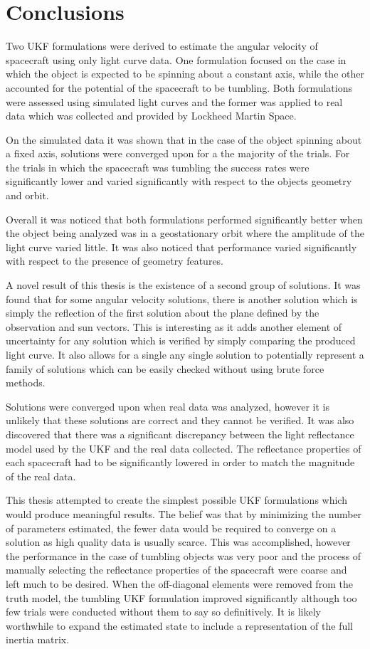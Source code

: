 \chapter{Conclusions}

Two UKF formulations were derived to estimate the angular velocity of spacecraft using only light curve data. One formulation focused on the case in which the object is expected to be spinning about a constant axis, while the other accounted for the potential of the spacecraft to be tumbling. Both formulations were assessed using simulated light curves and the former was applied to real data which was collected and provided by Lockheed Martin Space. 

On the simulated data it was shown that in the case of the object spinning about a fixed axis, solutions were converged upon for a the majority of the trials. For the trials in which the spacecraft was tumbling the success rates were significantly lower and varied significantly with respect to the objects geometry and orbit. 

Overall it was noticed that both formulations performed significantly better when the object being analyzed was in a geostationary orbit where the amplitude of the light curve varied little. It was also noticed that performance varied significantly with respect to the presence of geometry features. 

A novel result of this thesis is the existence of a second group of solutions. It was found that for some angular velocity solutions, there is another solution which is simply the reflection of the first solution about the plane defined by the observation and sun vectors. This is interesting as it adds another element of uncertainty for any solution which is verified by simply comparing the produced light curve. It also allows for a single any single solution to potentially represent a family of solutions which can be easily checked without using brute force methods.

Solutions were converged upon when real data was analyzed, however it is unlikely that these solutions are correct and they cannot be verified. It was also discovered that there was a significant discrepancy between the light reflectance model used by the UKF and the real data collected. The reflectance properties of each spacecraft had to be significantly lowered in order to match the magnitude of the real data.

This thesis attempted to create the simplest possible UKF formulations which would produce meaningful results. The belief was that by minimizing the number of parameters estimated, the fewer data would be required to converge on a solution as high quality data is usually scarce. This was accomplished, however the performance in the case of tumbling objects was very poor and the process of manually selecting the reflectance properties of the spacecraft were coarse and left much to be desired. When the off-diagonal elements were removed from the truth model, the tumbling UKF formulation improved significantly although too few trials were conducted without them to say so definitively. It is likely worthwhile to expand the estimated state to include a representation of the full inertia matrix.


